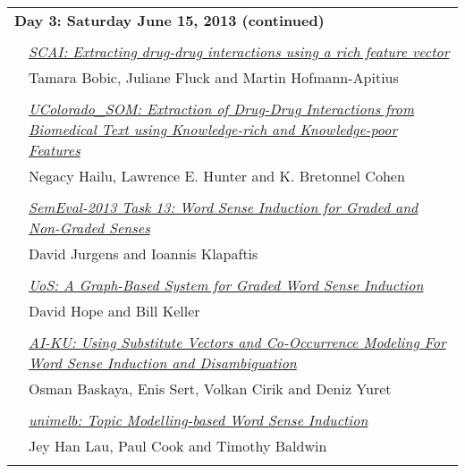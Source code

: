 \begin{tabular}{p{20mm}p{138mm}}
\\
\multicolumn{2}{l}{\bf Day 3: Saturday June 15, 2013 (continued)} \\\\
 & \hyperlink{page.675}{\em SCAI: Extracting drug-drug interactions using a rich feature vector}\\
         & Tamara Bobic, Juliane Fluck and Martin Hofmann-Apitius \\
\\

 & \hyperlink{page.684}{\em UColorado\_SOM: Extraction of Drug-Drug Interactions from Biomedical Text using Knowledge-rich and Knowledge-poor Features}\\
         & Negacy Hailu, Lawrence E. Hunter and K. Bretonnel Cohen \\
\\


& \hyperlink{page.290}{\em SemEval-2013 Task 13: Word Sense Induction for Graded and Non-Graded Senses}\\
         & David Jurgens and Ioannis Klapaftis \\
\\


 & \hyperlink{page.689}{\em UoS: A Graph-Based System for Graded Word Sense Induction}\\
         & David Hope and Bill Keller \\
\\


& \hyperlink{page.300}{\em AI-KU: Using Substitute Vectors and Co-Occurrence Modeling For Word Sense Induction and Disambiguation}\\
         & Osman Baskaya, Enis Sert, Volkan Cirik and Deniz Yuret \\
\\


& \hyperlink{page.307}{\em unimelb: Topic Modelling-based Word Sense Induction}\\
         & Jey Han Lau, Paul Cook and Timothy Baldwin \\
\\



\end{tabular}
